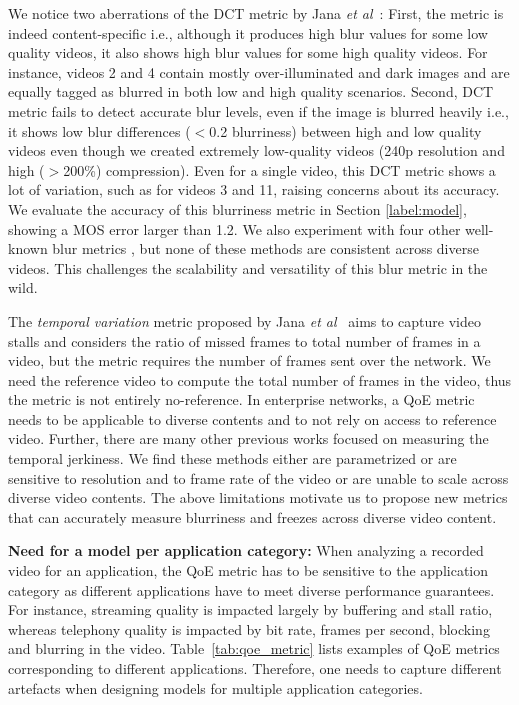 We notice two aberrations of the DCT metric by Jana {\em et al}~\cite{jana2016qoe}: First, the metric is indeed content-specific i.e., although it produces high blur values for some low quality videos, it also shows high blur values for some high quality videos. For instance, videos 2 and 4 contain mostly over-illuminated and dark images and are equally tagged as blurred in both low and high quality scenarios. Second, DCT metric fails to detect accurate blur levels, even if the image is blurred heavily i.e., it shows low blur differences ($<$0.2 blurriness) between high and low quality videos even though we created extremely low-quality videos (240p resolution and high ($>$200\%) compression). Even for a single video, this DCT metric shows a lot of variation, such as for videos 3 and 11, raising concerns about its accuracy. We evaluate the accuracy of this blurriness metric in Section \ref{label:model}, showing a MOS error larger than 1.2. We also experiment with four other well-known blur metrics \cite{golestaneh2014no, mittal2012no, tong2004blur, marziliano2002no}, but none of these methods are consistent across diverse videos. This challenges the scalability and versatility of this blur metric in the wild. 

The {\em temporal variation} metric proposed by Jana {\em et al}~\cite{jana2016qoe} aims to capture video stalls and considers the ratio of missed frames to total number of frames in a video, but the metric requires the number of frames sent over the network. We need the reference video to compute the total number of frames in the video, thus the metric is not entirely no-reference. 
In enterprise networks, a QoE metric needs to be applicable to diverse contents and to not rely on access to reference video.
Further, there are many other previous works \cite{wolf2009no, borer2010model, usman2017no, pastrana2006automatic} focused on measuring the temporal jerkiness. We find these methods  either are parametrized or are sensitive to resolution and to frame rate of the video or are unable to scale across diverse video contents. The above limitations motivate us to propose new metrics that can accurately measure blurriness and freezes across diverse video content.

{\bf Need for a model per application category:}
When analyzing a recorded video for an application, the QoE metric has to be sensitive to the application category as different applications have to meet diverse performance guarantees. For instance, streaming quality is impacted largely by buffering and stall ratio, whereas telephony quality is impacted by bit rate, frames per second, blocking and blurring in the video. Table~\ref{tab:qoe_metric} lists examples of QoE metrics corresponding to different applications. Therefore, one needs to capture different artefacts when designing models for multiple application categories.

